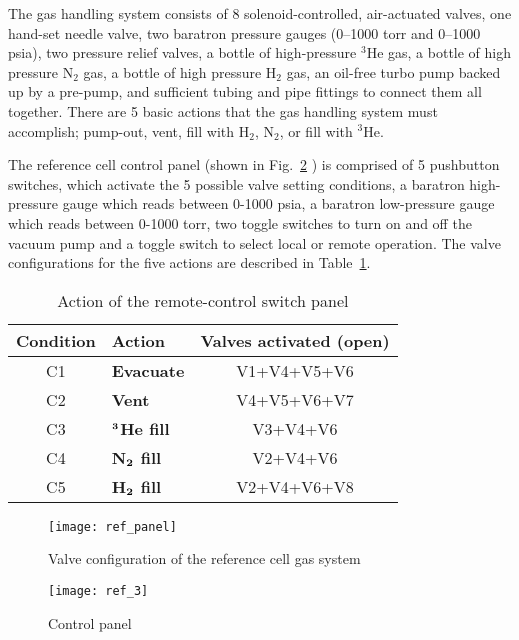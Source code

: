 {The gas handling system consists of 8 solenoid-controlled,
air-actuated valves, one hand-set needle valve, two baratron pressure
gauges (0--1000 torr and 0--1000 psia), two pressure relief valves, a
bottle of high-pressure $^3$He gas, a bottle of high pressure N$_2$
gas, a bottle of high pressure H$_2$ gas, an oil-free turbo pump
backed up by a pre-pump, and sufficient tubing and pipe fittings to
connect them all together.  There are 5 basic actions that the gas
handling system must accomplish; pump-out, vent, fill with H$_2$, N$_2$, or 
fill with $^3$He. 

The reference cell control panel (shown in Fig.~\ref{fig:refcell3} )
is comprised of 5 pushbutton switches, which activate the 5 possible
valve setting conditions, a baratron high-pressure gauge which reads
between 0-1000 psia, a baratron low-pressure gauge which reads between
0-1000 torr, two toggle switches to turn on and off the vacuum pump
and a toggle switch to select local or remote operation.  The valve
configurations for the five actions are described in
Table~\ref{tab:refcell}.

\begin{table}
\begin{center}
\begin{tabular}{|c|l|c|}
\hline\hline
Condition & Action & Valves activated (open) \rule[-2.5mm]{0mm}{7mm}\\
\hline
C1 & {\bf Evacuate} & V1+V4+V5+V6 \\
C2 & {\bf Vent} & V4+V5+V6+V7 \\
C3 & {\bf $\bf ^3$He fill} & V3+V4+V6 \\
C4 & {\bf N$\bf _2$ fill } & V2+V4+V6 \\
C5 & {\bf H$\bf _2$ fill } & V2+V4+V6+V8 \\
\hline\hline
\end{tabular}
\caption{Action of the remote-control switch panel}
\label{tab:refcell}
\end{center}
\end{table}
\begin{figure}
\begin{center}
\centerline{ \texttt{[image: ref\_panel]}}
\caption{Valve configuration of the reference cell gas system}
\label{fig:refcell2}
\end{center}
\end{figure}

\begin{figure}
\begin{center}
\centerline{\texttt{[image: ref\_3]}}
\caption{Control panel}
\label{fig:refcell3}
\end{center}
\end{figure}


}
